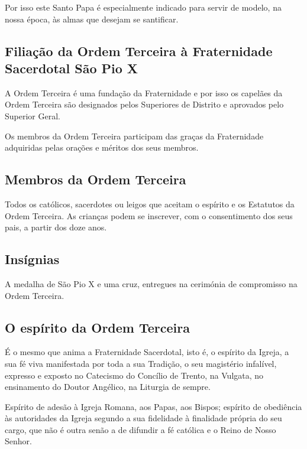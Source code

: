 \documentclass[11pt]{article}
\begin{document}
Por isso este Santo Papa é especialmente indicado para servir de modelo, na nossa época, às almas que desejam se santificar.

\subsection{Filiação da Ordem Terceira à Fraternidade Sacerdotal São Pio X}\label{subsec:filiação-da-ordem-terceira-à-fraternidade-sacerdotal-são-pio-x}

A Ordem Terceira é uma fundação da Fraternidade e por isso os capelães da Ordem Terceira são designados pelos Superiores de Distrito e aprovados pelo Superior Geral.

Os membros da Ordem Terceira participam das graças da Fraternidade adquiridas pelas orações e méritos dos seus membros.

\subsection{Membros da Ordem Terceira}\label{subsec:membros-da-ordem-terceira}

Todos os católicos, sacerdotes ou leigos que aceitam o espírito e os Estatutos da Ordem Terceira.
As crianças podem se inscrever, com o consentimento dos seus pais, a partir dos doze anos.

\subsection{Insígnias}\label{subsec:insígnias}

A medalha de São Pio X e uma cruz, entregues na cerimónia de compromisso na Ordem Terceira.

\subsection{O espírito da Ordem Terceira}\label{subsec:o-espírito-da-ordem-terceira}

É o mesmo que anima a Fraternidade Sacerdotal, isto é, o espírito da Igreja, a sua fé viva manifestada por toda a sua Tradição, o seu magistério infalível, expresso e exposto no Catecismo do Concílio de Trento, na Vulgata, no ensinamento do Doutor Angélico, na Liturgia de sempre.

Espírito de adesão à Igreja Romana, aos Papas, aos Bispos;
espírito de obediência às autoridades da Igreja segundo a sua fidelidade à finalidade própria do seu cargo, que não é outra senão a de difundir a fé católica e o Reino de Nosso Senhor.
\end{document}
